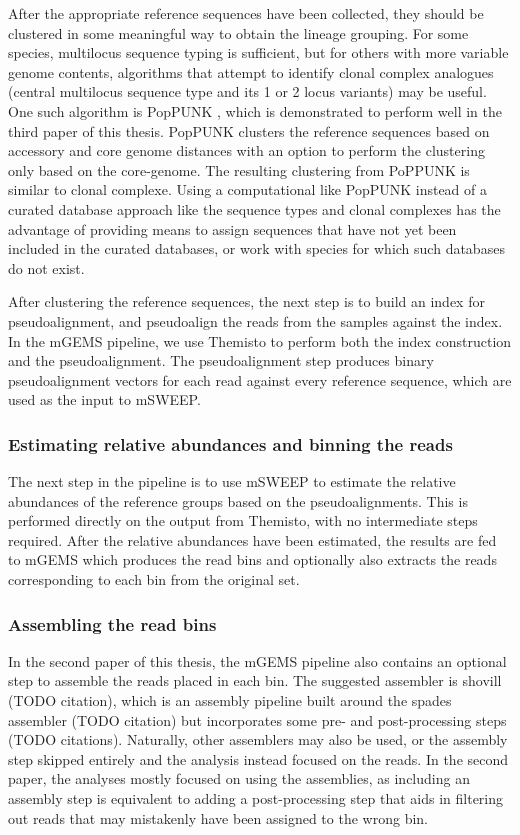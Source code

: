\documentclass[officiallayout]{tktla}
\begin{document}
After the appropriate reference sequences have been collected, they
should be clustered in some meaningful way to obtain the lineage
grouping. For some species, multilocus sequence typing is sufficient,
but for others with more variable genome contents, algorithms that
attempt to identify clonal complex analogues (central multilocus
sequence type and its 1 or 2 locus variants) may be useful. One such
algorithm is PopPUNK \citep{lees2019fast}, which is demonstrated to
perform well in the third paper of this thesis. PopPUNK clusters the
reference sequences based on accessory and core genome distances with
an option to perform the clustering only based on the core-genome. The
resulting clustering from PoPPUNK is similar to clonal complexe. Using
a computational like PopPUNK instead of a curated database approach
like the sequence types and clonal complexes has the advantage of
providing means to assign sequences that have not yet been included in
the curated databases, or work with species for which such databases
do not exist.

After clustering the reference sequences, the next step is to build an
index for pseudoalignment, and pseudoalign the reads from the samples
against the index. In the mGEMS pipeline, we use Themisto
\citep{maklin_bacterial_2021} to perform both the index construction
and the pseudoalignment. The pseudoalignment step produces binary
pseudoalignment vectors for each read against every reference
sequence, which are used as the input to mSWEEP.

\subsubsection{Estimating relative abundances and binning the reads}

The next step in the pipeline is to use mSWEEP to estimate the
relative abundances of the reference groups based on the
pseudoalignments. This is performed directly on the output from
Themisto, with no intermediate steps required. After the relative
abundances have been estimated, the results are fed to mGEMS which
produces the read bins and optionally also extracts the reads
corresponding to each bin from the original set.

\subsubsection{Assembling the read bins}

In the second paper of this thesis, the mGEMS pipeline also contains
an optional step to assemble the reads placed in each bin. The
suggested assembler is shovill (TODO citation), which is an assembly
pipeline built around the spades assembler (TODO citation) but
incorporates some pre- and post-processing steps (TODO
citations). Naturally, other assemblers may also be used, or the
assembly step skipped entirely and the analysis instead focused on the
reads. In the second paper, the analyses mostly focused on using the
assemblies, as including an assembly step is equivalent to adding a
post-processing step that aids in filtering out reads that may
mistakenly have been assigned to the wrong bin.
\end{document}
